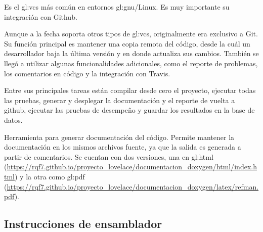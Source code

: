 {%
  Es el \gls{gl:vcs} más común en entornos \acrshort{gl:gnu}/Linux.
  Es muy importante su integración con Github.
}

{%
  Aunque a la fecha soporta otros tipos de \gls{gl:vcs}, originalmente
  era exclusivo a Git. Su función principal es mantener una copia
  remota del código, desde la cuál un desarrollador baja la última versión
  y en donde actualiza sus cambios. También se llegó a utilizar algunas
  funcionalidades adicionales, como el reporte de problemas, los comentarios
  en código y la integración con Travis.
}

{%
  Entre sus principales tareas están compilar desde cero el proyecto, ejecutar
  todas las pruebas, generar y desplegar la documentación y el reporte de
  vuelta a github, ejecutar las pruebas de desempeño y guardar los resultados
  en la base de datos.
}

{%
  Herramienta para generar documentación del código. Permite mantener la
  documentación en los mismos archivos fuente, ya que la salida es generada
  a partir de comentarios. Se cuentan con dos versiones, una en
  \acrshort{gl:html} (\url{https://rqf7.github.io/proyecto_lovelace/documentacion_doxygen/html/index.html})
  y la otra como \acrshort{gl:pdf} (\url{https://rqf7.github.io/proyecto_lovelace/documentacion_doxygen/latex/refman.pdf}).
}

\subsection{Instrucciones de ensamblador}

